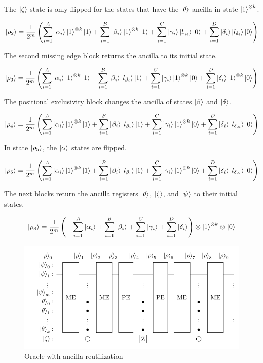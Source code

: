 \documentclass[10pt,a4paper]{article}
\begin{document}
The $\ket{\zeta}$ state is only flipped for the states that have the $\ket{\theta}$ ancilla in state $\ket{1}^{\otimes k}$.

$$
\ket{\rho_2} = \frac{1}{2^m} \left( \sum_{i=1}^{A} \ket{\alpha_i} \ket{1}^{\otimes k} \ket{1} + \sum_{i=1}^{B} \ket{\beta_i} \ket{1}^{\otimes k} \ket{1} + \sum_{i=1}^{C} \ket{\gamma_i} \ket{l_{\gamma_i}} \ket{0} + \sum_{i=1}^{D} \ket{\delta_i} \ket{l_{\delta_i}} \ket{0} \right)
$$

The second missing edge block returns the ancilla to its initial state.

$$
\ket{\rho_3} = \frac{1}{2^m} \left( \sum_{i=1}^{A} \ket{\alpha_i} \ket{1}^{\otimes k} \ket{1} + \sum_{i=1}^{B} \ket{\beta_i} \ket{l_{\beta_i}} \ket{1} + \sum_{i=1}^{C} \ket{\gamma_i} \ket{1}^{\otimes k} \ket{0} + \sum_{i=1}^{D} \ket{\delta_i} \ket{1}^{\otimes k} \ket{0} \right)
$$

The positional exclusivity block changes the ancilla of states $\ket{\beta}$ and $\ket{\delta}$.

$$
\ket{\rho_4} = \frac{1}{2^m} \left( \sum_{i=1}^{A} \ket{\alpha_i} \ket{1}^{\otimes k} \ket{1} + \sum_{i=1}^{B} \ket{\beta_i} \ket{l_{\beta_i}} \ket{1} + \sum_{i=1}^{C} \ket{\gamma_i} \ket{1}^{\otimes k} \ket{0} + \sum_{i=1}^{D} \ket{\delta_i} \ket{l_{\delta_{2i}}} \ket{0} \right)
$$

In state $\ket{\rho_5}$, the $\ket{\alpha}$ states are flipped.

$$
\ket{\rho_5} = \frac{1}{2^m} \left( \sum_{i=1}^{A} \ket{\alpha_i} \ket{1}^{\otimes k} \ket{1} + \sum_{i=1}^{B} \ket{\beta_i} \ket{l_{\beta_i}} \ket{1} + \sum_{i=1}^{C} \ket{\gamma_i} \ket{1}^{\otimes k} \ket{0} + \sum_{i=1}^{D} \ket{\delta_i} \ket{l_{\delta_{2i}}} \ket{0} \right)
$$

The next blocks return the ancilla registers $\ket{\theta}$, $\ket{\zeta}$, and $\ket{\psi}$ to their initial states.

$$
\ket{\rho_8} = \frac{1}{2^m} \left( - \sum_{i=1}^{A} \ket{\alpha_i} + \sum_{i=1}^{B} \ket{\beta_i} + \sum_{i=1}^{C} \ket{\gamma_i} + \sum_{i=1}^{D} \ket{\delta_i} \right) \otimes \ket{1}^{\otimes k} \otimes \ket{0}
$$

\begin{figure}[hbtp]
\centering
\includegraphics[scale=0.8]{figures/oracle_circuit.pdf}
\caption{Oracle with ancilla reutilization}
\end{figure}
\end{document}
